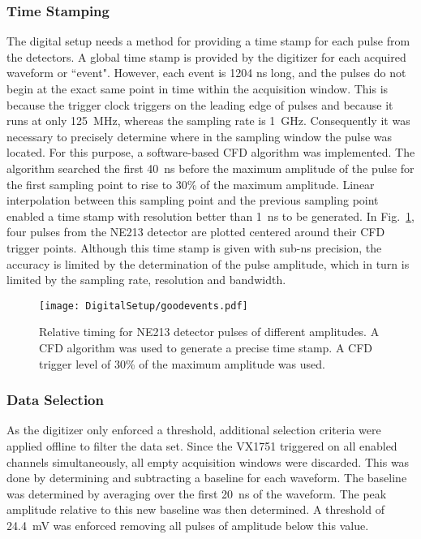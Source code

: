 \documentclass[main.tex]{subfiles}
\begin{document}
\subsubsection{Time Stamping}
The digital setup needs a method for providing a time stamp for each pulse from the detectors. A global time stamp is provided by the digitizer for each acquired waveform or ``event". However, each event is 1204 ns long, and the pulses do not begin at the exact same point in time within the acquisition window. This is because the trigger clock triggers on the leading edge of pulses and because it runs at only \SI{125}{MHz}, whereas the sampling rate is \SI{1}{GHz}. Consequently it was necessary to precisely determine where in the sampling window the pulse was located. For this purpose, a software-based CFD algorithm was implemented. The algorithm searched the first \SI{40}{ns} before the maximum amplitude of the pulse for the first sampling point to rise to 30\% of the maximum amplitude. Linear interpolation between this sampling point and the previous sampling point enabled a time stamp with resolution better than \SI{1}{ns} to be generated. In Fig.~\ref{fig:cfd_trig}, four pulses from the NE213 detector are plotted centered around their CFD trigger points. Although this time stamp is given with sub-ns precision, the accuracy is limited by the determination of the pulse amplitude, which in turn is limited by the sampling rate, resolution and bandwidth. 

\begin{figure}[hb!]
    \centering
        \texttt{[image: DigitalSetup/goodevents.pdf]}
        \caption[Relative timing for NE213 detector pulses of different amplitudes.]{Relative timing for NE213 detector pulses of different amplitudes. A CFD algorithm was used to generate a precise time stamp. A CFD trigger level of 30\% of the maximum amplitude was used.}
    \label{fig:cfd_trig} 
\end{figure}

\subsubsection{Data Selection}
As the digitizer only enforced a threshold, additional selection criteria were applied offline to filter the data set. Since the VX1751 triggered on all enabled channels simultaneously, all empty acquisition windows were discarded. This was done by determining and subtracting a baseline for each waveform. The baseline was determined by averaging over the first \SI{20}{ns} of the waveform. The peak amplitude relative to this new baseline was then determined. A threshold of \SI{24.4}{mV} was enforced removing all pulses of amplitude below this value.
\end{document}
